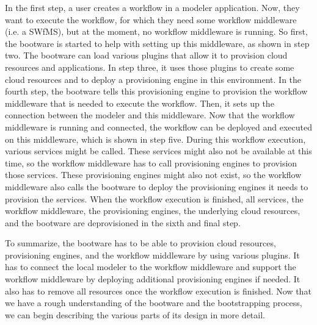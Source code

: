 In the first step, a user creates a workflow in a modeler application.
Now, they want to execute the workflow, for which they need some workflow middleware (i.e. a SWfMS), but at the moment, no workflow middleware is running.
So first, the bootware is started to help with setting up this middleware, as shown in step two.
The bootware can load various plugins that allow it to provision cloud resources and applications.
In step three, it uses those plugins to create some cloud resources and to deploy a provisioning engine in this environment.
In the fourth step, the bootware tells this provisioning engine to provision the workflow middleware that is needed to execute the workflow.
Then, it sets up the connection between the modeler and this middleware.
Now that the workflow middleware is running and connected, the workflow can be deployed and executed on this middleware, which is shown in step five.
During this workflow execution, various services might be called.
These services might also not be available at this time, so the workflow middleware has to call provisioning engines to provision those services.
These provisioning engines might also not exist, so the workflow middleware also calls the bootware to deploy the provisioning engines it needs to provision the services.
When the workflow execution is finished, all services, the workflow middleware, the provisioning engines, the underlying cloud resources, and the bootware are deprovisioned in the sixth and final step.

To summarize, the bootware has to be able to provision cloud resources, provisioning engines, and the workflow middleware by using various plugins.
It has to connect the local modeler to the workflow middleware and support the workflow middleware by deploying additional provisioning engines if needed.
It also has to remove all resources once the workflow execution is finished.
Now that we have a rough understanding of the bootware and the bootstrapping process, we can begin describing the various parts of its design in more detail.













